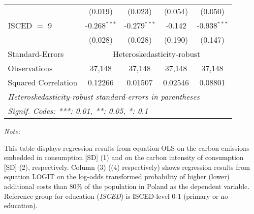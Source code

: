 \begin{table}[htbp!]
\begin{adjustbox}{width = 1\textwidth, max height = 0.95\textheight, center}
\begin{threeparttable}[b]
\begin{tabular}{lcccc}
                                 & (0.019)            & (0.023)            & (0.054)        & (0.050)\\   
            ISCED $=$ 9          & -0.268$^{***}$     & -0.279$^{***}$     & -0.142         & -0.938$^{***}$\\   
                                 & (0.028)            & (0.028)            & (0.190)        & (0.147)\\   
            \midrule 
            Standard-Errors & \multicolumn{4}{c}{Heteroskedasticity-robust} \\ 
            Observations         & 37,148             & 37,148             & 37,148         & 37,148\\  
            Squared Correlation  & 0.12266            & 0.01507            & 0.02546        & 0.08801\\  
            \midrule \midrule
            \multicolumn{5}{l}{\emph{Heteroskedasticity-robust standard-errors in parentheses}}\\
            \multicolumn{5}{l}{\emph{Signif. Codes: ***: 0.01, **: 0.05, *: 0.1}}\\
         \end{tabular}
         
         \begin{tablenotes}\item \medskip \textit{Note:}
            \item This table displays regression results from equation OLS on the carbon emissions embedded in consumption [SD] (1) and on the carbon intensity of consumption [SD] (2), respectively. 
                                      Column (3) ((4) respectively) shows regression results from equation LOGIT on the log-odds transformed probability of higher (lower) additional costs than 80\% of the population in Poland as the dependent variable. Reference group for education (\textit{ISCED}) is ISCED-level 0-1 (primary or no education).
         \end{tablenotes}
      \end{threeparttable}
   \end{adjustbox}
\end{table}


